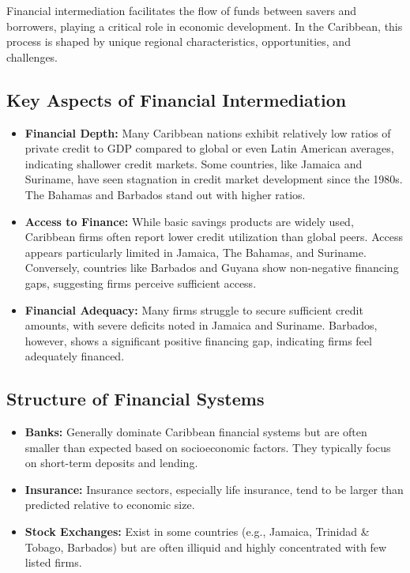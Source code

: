 \newpage



Financial intermediation facilitates the flow of funds between savers and borrowers, playing a critical role in economic development. In the Caribbean, this process is shaped by unique regional characteristics, opportunities, and challenges.

\subsection{Key Aspects of Financial Intermediation}
\begin{itemize}
    \item \textbf{Financial Depth:} Many Caribbean nations exhibit relatively low ratios of private credit to GDP compared to global or even Latin American averages, indicating shallower credit markets. Some countries, like Jamaica and Suriname, have seen stagnation in credit market development since the 1980s. The Bahamas and Barbados stand out with higher ratios.
    \item \textbf{Access to Finance:} While basic savings products are widely used, Caribbean firms often report lower credit utilization than global peers. Access appears particularly limited in Jamaica, The Bahamas, and Suriname. Conversely, countries like Barbados and Guyana show non-negative financing gaps, suggesting firms perceive sufficient access.
    \item \textbf{Financial Adequacy:} Many firms struggle to secure sufficient credit amounts, with severe deficits noted in Jamaica and Suriname. Barbados, however, shows a significant positive financing gap, indicating firms feel adequately financed.
\end{itemize}

\subsection{Structure of Financial Systems}
\begin{itemize}
    \item \textbf{Banks:} Generally dominate Caribbean financial systems but are often smaller than expected based on socioeconomic factors. They typically focus on short-term deposits and lending.
    \item \textbf{Insurance:} Insurance sectors, especially life insurance, tend to be larger than predicted relative to economic size.
    \item \textbf{Stock Exchanges:} Exist in some countries (e.g., Jamaica, Trinidad \& Tobago, Barbados) but are often illiquid and highly concentrated with few listed firms.
\end{itemize}

